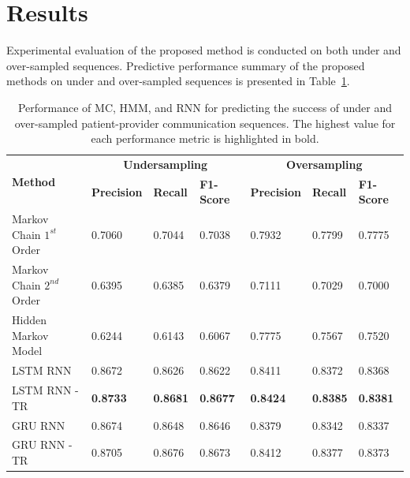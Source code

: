 \documentclass{amia_summit_2018}
\begin{document}

\section*{Results}
Experimental evaluation of the proposed method is conducted on both under and over-sampled sequences. Predictive performance summary of the proposed methods on under and over-sampled sequences is presented in Table~\ref{tab:result_under_over_sampled}.\\ 
\begin{table}[ht]
\centering
\caption{Performance of MC, HMM, and RNN for predicting the success of under and over-sampled patient-provider communication sequences. The highest value for each performance metric is highlighted in bold.}
\label{tab:result_under_over_sampled}
  \begin{tabular}{|l|l|l|l|l|l|l|}
  \hline
   \multirow{2}{*}{\textbf{Method}} & \multicolumn{3}{|c|}{\textbf{Undersampling}} & \multicolumn{3}{|c|}{\textbf{Oversampling}} \\\cline{2-7}
   & \textbf{Precision}  & \textbf{Recall} & \textbf{F1-Score} & \textbf{Precision}  & \textbf{Recall} & \textbf{F1-Score}\\ \hline    
    
 Markov Chain $1^{st}$ Order & 0.7060 & 0.7044 & 0.7038 & 0.7932 & 0.7799 & 0.7775 \\ \hline
 Markov Chain $2^{nd}$ Order & 0.6395 & 0.6385 & 0.6379 & 0.7111 & 0.7029 & 0.7000\\ \hline
 Hidden Markov Model & 0.6244 & 0.6143 & 0.6067 & 0.7775 & 0.7567 & 0.7520\\ \hline
 LSTM RNN & 0.8672 & 0.8626 & 0.8622 & 0.8411 & 0.8372 & 0.8368\\ \hline
 LSTM RNN - TR & \textbf{0.8733} & \textbf{0.8681} & \textbf{0.8677} & \textbf{0.8424} & \textbf{0.8385} & \textbf{0.8381}\\ \hline
 GRU RNN & 0.8674 & 0.8648 & 0.8646 & 0.8379 & 0.8342 & 0.8337\\ \hline
 GRU RNN - TR & 0.8705 & 0.8676 & 0.8673 & 0.8412 & 0.8377 & 0.8373\\ \hline 
  \end{tabular}
\end{table}  
\end{document}
